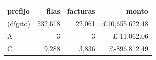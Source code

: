 \begin{tabular}{lrrr}
\toprule
prefijo & filas & facturas & monto \\
\midrule
(dígito) & 532,618 & 22,061 & \pounds{}10,655,622.48 \\
A & 3 & 3 & \pounds{}-11,062.06 \\
C & 9,288 & 3,836 & \pounds{}-896,812.49 \\
\bottomrule
\end{tabular}